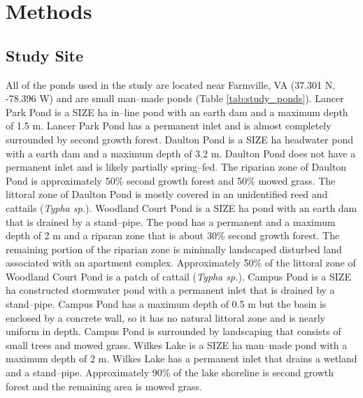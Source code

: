 \section{Methods}
\subsection{Study Site}
All of the ponds used in the study are located near Farmville, VA (37.301 N, -78.396 W) and are small man--made ponds (Table \ref{tab:study_ponds}). Lancer Park Pond is a SIZE ha in--line pond with an earth dam and a maximum depth of 1.5 m. Lancer Park Pond has a permanent inlet and is almost completely surrounded by second growth forest. Daulton Pond is a SIZE ha headwater pond with a earth dam and a maximum depth of 3.2 m. Daulton Pond does not have a permanent inlet and is likely partially spring--fed. The riparian zone of Daulton Pond is approximately 50\% second growth forest and 50\% mowed grass. The littoral zone of Daulton Pond is mostly covered in an unidentified reed and cattails (\emph{Typha sp.}). Woodland Court Pond is a SIZE ha pond with an earth dam that is drained by a stand--pipe. The pond has a permanent and a maximum depth of 2 m and a riparan zone that is about 30\% second growth forest. The remaining portion of the riparian zone is minimally landscaped disturbed land associated with an apartment complex. Approximately 50\% of the littoral zone of Woodland Court Pond is a patch of cattail (\emph{Typha sp.}). Campus Pond is a SIZE ha constructed stormwater pond with a permanent inlet that is drained by a stand--pipe. Campus Pond has a maximum depth of 0.5 m but the basin is enclosed by a concrete wall, so it has no natural littoral zone and is nearly uniform in depth. Campus Pond is surrounded by landscaping that consists of small trees and mowed grass. Wilkes Lake is a SIZE ha man--made pond with a maximum depth of 2 m. Wilkes Lake has a permanent inlet that drains a wetland and a stand--pipe. Approximately 90\% of the lake shoreline is second growth forest and the remaining area is mowed grass.


    
